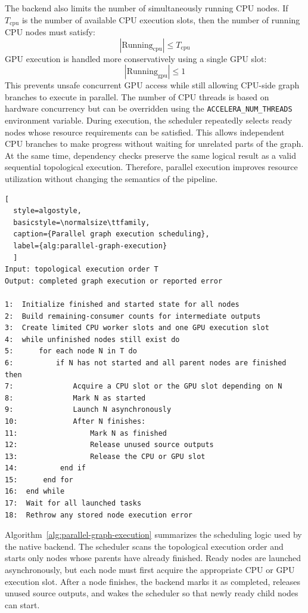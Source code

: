 \documentclass[12pt,a4paper,oneside]{report}
\begin{document}
The backend also limits the number of simultaneously running CPU nodes. If
\(T_{\text{cpu}}\) is the number of available CPU execution slots, then the
number of running CPU nodes must satisfy:
\[
|\text{Running}_{\text{cpu}}| \leq T_{\text{cpu}}
\]
GPU execution is handled more conservatively using a single GPU slot:
\[
|\text{Running}_{\text{gpu}}| \leq 1
\]
This prevents unsafe concurrent GPU access while still allowing CPU-side graph
branches to execute in parallel. The number of CPU threads is based on hardware
concurrency but can be overridden using the
\texttt{ACCELERA\_NUM\_THREADS} environment variable. During execution, the
scheduler repeatedly selects ready nodes whose resource requirements can be
satisfied. This allows independent CPU branches to make progress without waiting
for unrelated parts of the graph. At the same time, dependency checks preserve
the same logical result as a valid sequential topological execution. Therefore,
parallel execution improves resource utilization without changing the semantics
of the pipeline.


\begin{lstlisting}[
  style=algostyle,
  basicstyle=\normalsize\ttfamily,
  caption={Parallel graph execution scheduling},
  label={alg:parallel-graph-execution}
  ]
Input: topological execution order T
Output: completed graph execution or reported error

1:  Initialize finished and started state for all nodes
2:  Build remaining-consumer counts for intermediate outputs
3:  Create limited CPU worker slots and one GPU execution slot
4:  while unfinished nodes still exist do
5:      for each node N in T do
6:          if N has not started and all parent nodes are finished then
7:              Acquire a CPU slot or the GPU slot depending on N
8:              Mark N as started
9:              Launch N asynchronously
10:             After N finishes:
11:                 Mark N as finished
12:                 Release unused source outputs
13:                 Release the CPU or GPU slot
14:          end if
15:      end for
16:  end while
17:  Wait for all launched tasks
18:  Rethrow any stored node execution error
\end{lstlisting}

Algorithm~\ref{alg:parallel-graph-execution} summarizes the scheduling logic used
by the native backend. The scheduler scans the topological execution order and
starts only nodes whose parents have already finished. Ready nodes are launched
asynchronously, but each node must first acquire the appropriate CPU or GPU
execution slot. After a node finishes, the backend marks it as completed,
releases unused source outputs, and wakes the scheduler so that newly ready
child nodes can start.
\end{document}
